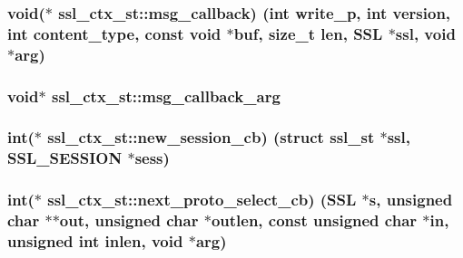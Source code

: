 \subsubsection[{\texorpdfstring{msg\+\_\+callback}{msg_callback}}]{\setlength{\rightskip}{0pt plus 5cm}void($\ast$ ssl\+\_\+ctx\+\_\+st\+::msg\+\_\+callback) (int write\+\_\+p, int version, int content\+\_\+type, const void $\ast$buf, size\+\_\+t {\bf len}, {\bf S\+SL} $\ast$ssl, void $\ast$arg)}\hypertarget{structssl__ctx__st_ada261e72ed5d3ce460ca6dcf34ec53dd}{}\label{structssl__ctx__st_ada261e72ed5d3ce460ca6dcf34ec53dd}
\subsubsection[{\texorpdfstring{msg\+\_\+callback\+\_\+arg}{msg_callback_arg}}]{\setlength{\rightskip}{0pt plus 5cm}void$\ast$ ssl\+\_\+ctx\+\_\+st\+::msg\+\_\+callback\+\_\+arg}\hypertarget{structssl__ctx__st_ad1aba043a97ea40fcb8a39e65698f8c0}{}\label{structssl__ctx__st_ad1aba043a97ea40fcb8a39e65698f8c0}
\subsubsection[{\texorpdfstring{new\+\_\+session\+\_\+cb}{new_session_cb}}]{\setlength{\rightskip}{0pt plus 5cm}int($\ast$ ssl\+\_\+ctx\+\_\+st\+::new\+\_\+session\+\_\+cb) (struct {\bf ssl\+\_\+st} $\ast$ssl, {\bf S\+S\+L\+\_\+\+S\+E\+S\+S\+I\+ON} $\ast$sess)}\hypertarget{structssl__ctx__st_a114da734a32555bec7ac1543e7fcef11}{}\label{structssl__ctx__st_a114da734a32555bec7ac1543e7fcef11}
\subsubsection[{\texorpdfstring{next\+\_\+proto\+\_\+select\+\_\+cb}{next_proto_select_cb}}]{\setlength{\rightskip}{0pt plus 5cm}int($\ast$ ssl\+\_\+ctx\+\_\+st\+::next\+\_\+proto\+\_\+select\+\_\+cb) ({\bf S\+SL} $\ast$s, unsigned char $\ast$$\ast$out, unsigned char $\ast$outlen, const unsigned char $\ast$in, unsigned int inlen, void $\ast$arg)}\hypertarget{structssl__ctx__st_a0064f01fff457ffcbd1182ddd51839b8}{}\label{structssl__ctx__st_a0064f01fff457ffcbd1182ddd51839b8}
